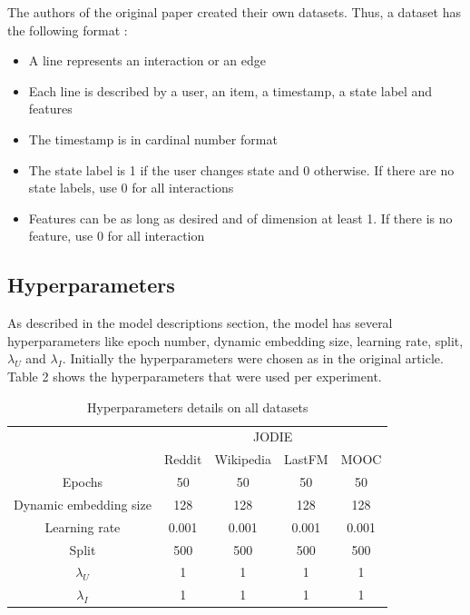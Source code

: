 The authors of the original paper created their own datasets. Thus, a dataset has the following format :
\begin{itemize}
    \item A line represents an interaction or an edge
    \item Each line is described by a user, an item, a timestamp, a state label and features
    \item The timestamp is in cardinal number format
    \item The state label is 1 if the user changes state and 0 otherwise. If there are no state labels, use 0 for all interactions
    \item Features can be as long as desired and of dimension at least 1. If there is no feature, use 0 for all interaction
\end{itemize}

\newpage
\subsection*{Hyperparameters}

As described in the model descriptions section, the model has several hyperparameters like epoch number, dynamic embedding size, learning rate, split, $\lambda_U$ and $\lambda_I$. Initially the hyperparameters were chosen as in the original article. Table 2 shows the hyperparameters that were used per experiment.

\begin{table}[H]
    \centering
    \begin{tabular}{|c|c|c|c|c|}
        \cline{2-5} \multicolumn{1}{c|}{} & \multicolumn{4}{c|}{JODIE}\\
        \cline{2-5} \multicolumn{1}{c|}{} & Reddit & Wikipedia & LastFM & MOOC \\\hline
        Epochs & 50 & 50 & 50 & 50 \\\hline
        Dynamic embedding size & 128 & 128 & 128 & 128 \\\hline
        Learning rate & 0.001 & 0.001 & 0.001 & 0.001 \\\hline
        Split & 500 & 500 & 500 & 500 \\\hline
        $\lambda_U$ & 1 & 1 & 1 & 1 \\\hline
        $\lambda_I$ & 1 & 1 & 1 & 1 \\\hline
    \end{tabular}
    \caption{Hyperparameters details on all datasets}
\end{table}

